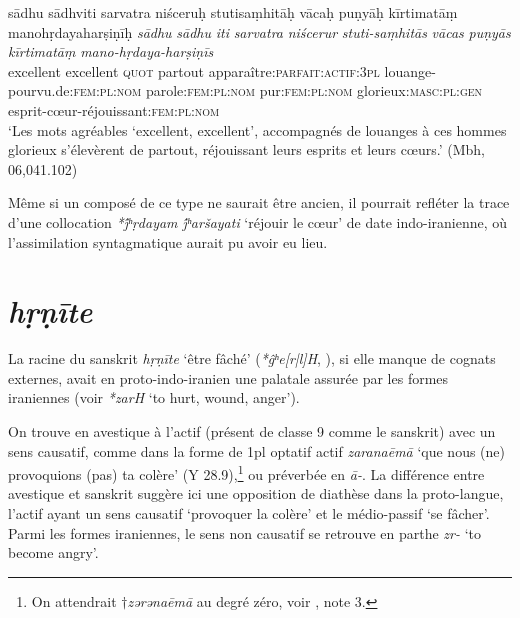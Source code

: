 \documentclass{article}
\newcommand{\ipa}[1]{{\phon\textit{#1}}}
\begin{document}
\begin{exe} 
\ex \label{ex:hrdayaharsinis} 
\glt sādhu sādhviti sarvatra niśceruḥ stutisaṃhitāḥ 
\glt vācaḥ puṇyāḥ kīrtimatāṃ manohṛdayaharṣiṇīḥ 
\gll 
\ipa{sādhu} \ipa{sādhu} \ipa{iti} \ipa{sarvatra} \ipa{niścerur} \ipa{stuti-saṃhitās} 
\ipa{vācas} \ipa{puṇyās} \ipa{kīrtimatāṃ} \ipa{mano-hṛdaya-harṣiṇīs}\\
excellent excellent \textsc{quot} partout apparaître:\textsc{parfait:actif:3pl} louange-pourvu.de:\textsc{fem:pl:nom} parole:\textsc{fem:pl:nom}
pur:\textsc{fem:pl:nom} glorieux:\textsc{masc:pl:gen} esprit-cœur-réjouissant:\textsc{fem:pl:nom} \\ 
\glt `Les mots agréables `excellent, excellent', accompagnés de louanges à ces  hommes glorieux s'élevèrent de partout, réjouissant leurs esprits et leurs cœurs.' (Mbh, 06,041.102)
\end{exe}

Même si un composé de ce type ne saurait être ancien, il pourrait refléter la trace d'une collocation \ipa{*j́ʰṛdayam j́ʰaršayati} `réjouir le cœur' de date indo-iranienne, où l'assimilation syntagmatique aurait pu avoir eu lieu.


\section{\ipa{hṛṇīte}} \label{sec:hrnite}
La racine du sanskrit \ipa{hṛṇīte} `être fâché' (\ipa{*ĝʰe[r|l]H}, \citealt[178]{liv}), si elle manque de cognats externes, avait en proto-indo-iranien une palatale assurée par les formes iraniennes (voir \citealt[469]{cheung07dictionary} \ipa{*zarH} ‘to hurt, wound, anger’). 

On trouve en avestique à l'actif (présent de classe 9 comme le sanskrit) avec un sens causatif, comme dans la forme de 1pl optatif actif \ipa{zaranaēmā} `que nous (ne) provoquions (pas) ta colère' (Y 28.9),\footnote{On attendrait $\dagger$\ipa{zərənaēmā} au degré zéro, voir \citet[178]{liv}, note 3.  } ou préverbée en \ipa{ā-}. La différence entre avestique et sanskrit suggère ici une opposition de diathèse dans la proto-langue, l'actif ayant un sens causatif `provoquer la colère' et le médio-passif `se fâcher'. Parmi les formes iraniennes, le sens non causatif se retrouve en parthe \ipa{zr-} `to become angry'.
\end{document}
